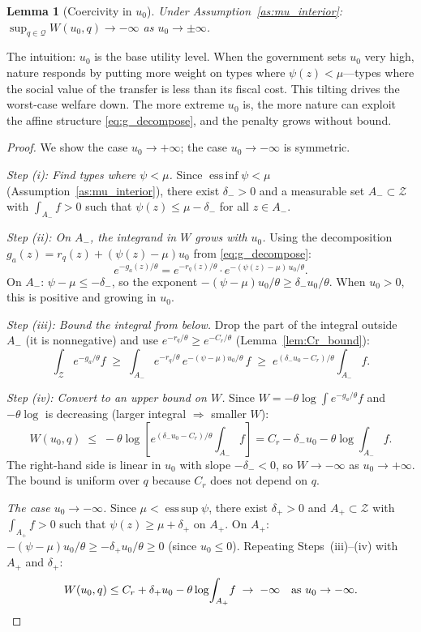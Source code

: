 \documentclass[12pt,a4paper]{article}
\theoremstyle{definition}
\theoremstyle{plain}
\newtheorem{lemma}{Lemma}[section]
\theoremstyle{remark}
\newcommand{\calZ}{\mathcal{Z}}
\begin{document}
\begin{lemma}[Coercivity in $u_0$]
\label{lem:coercivity}
Under Assumption~\ref{as:mu_interior}:
$\sup_{q \in \mathcal{Q}} W(u_0, q) \to -\infty$
as $u_0 \to \pm\infty$.
\end{lemma}

The intuition: $u_0$ is the base utility level.  When the
government sets $u_0$ very high, nature responds by putting
more weight on types where $\psi(z) < \mu$---types where
the social value of the transfer is less than its fiscal
cost.  This tilting drives the worst-case welfare down.
The more extreme $u_0$ is, the more nature can exploit the
affine structure \eqref{eq:g_decompose}, and the penalty
grows without bound.

\begin{proof}
We show the case $u_0 \to +\infty$; the case
$u_0 \to -\infty$ is symmetric.

\emph{Step (i): Find types where $\psi < \mu$.}
Since $\operatorname*{ess\,inf}\psi < \mu$
(Assumption~\ref{as:mu_interior}), there exist
$\delta_- > 0$ and a measurable set $A_- \subset \calZ$
with $\int_{A_-} f > 0$ such that
$\psi(z) \leq \mu - \delta_-$ for all $z \in A_-$.

\emph{Step (ii): On $A_-$, the integrand in $W$ grows
with $u_0$.}
Using the decomposition $g_a(z) = r_q(z) +
(\psi(z) - \mu)u_0$ from \eqref{eq:g_decompose}:
\[
  e^{-g_a(z)/\theta}
  = e^{-r_q(z)/\theta} \cdot
  e^{-(\psi(z)-\mu)\,u_0/\theta}.
\]
On $A_-$: $\psi - \mu \leq -\delta_-$, so the exponent
$-(\psi - \mu)u_0/\theta \geq \delta_- u_0/\theta$.
When $u_0 > 0$, this is positive and growing in $u_0$.

\emph{Step (iii): Bound the integral from below.}
Drop the part of the integral outside $A_-$ (it is
nonnegative) and use $e^{-r_q/\theta} \geq
e^{-C_r/\theta}$ (Lemma~\ref{lem:Cr_bound}):
\[
  \int_\calZ e^{-g_a/\theta}f
  \;\geq\; \int_{A_-} e^{-r_q/\theta}\,
  e^{-(\psi-\mu)u_0/\theta}\,f
  \;\geq\; e^{(\delta_- u_0 - C_r)/\theta}
  \int_{A_-}\!f.
\]

\emph{Step (iv): Convert to an upper bound on $W$.}
Since $W = -\theta\log\!\int e^{-g_a/\theta}f$ and
$-\theta\log$ is decreasing (larger integral $\Rightarrow$
smaller $W$):
\[
  W(u_0, q)
  \;\leq\; -\theta\log\!\left[
    e^{(\delta_- u_0 - C_r)/\theta}\int_{A_-}\!f
  \right]
  = C_r - \delta_- u_0
  - \theta\log\!\int_{A_-}\!f.
\]
The right-hand side is linear in $u_0$ with slope
$-\delta_- < 0$, so $W \to -\infty$ as
$u_0 \to +\infty$.  The bound is uniform over $q$
because $C_r$ does not depend on $q$.

\emph{The case $u_0 \to -\infty$.}
Since $\mu < \operatorname*{ess\,sup}\psi$, there exist
$\delta_+ > 0$ and $A_+ \subset \calZ$ with
$\int_{A_+} f > 0$ such that
$\psi(z) \geq \mu + \delta_+$ on $A_+$.
On $A_+$: $-(\psi - \mu)u_0/\theta \geq
-\delta_+ u_0/\theta \geq 0$ (since $u_0 \leq 0$).
Repeating Steps~(iii)--(iv) with $A_+$ and $\delta_+$:
\[
  W(u_0, q)
  \leq C_r + \delta_+ u_0
  - \theta\log\!\int_{A_+}\!f
  \;\to\; -\infty
  \quad \text{as } u_0 \to -\infty.\qedhere
\]
\end{proof}
\end{document}
